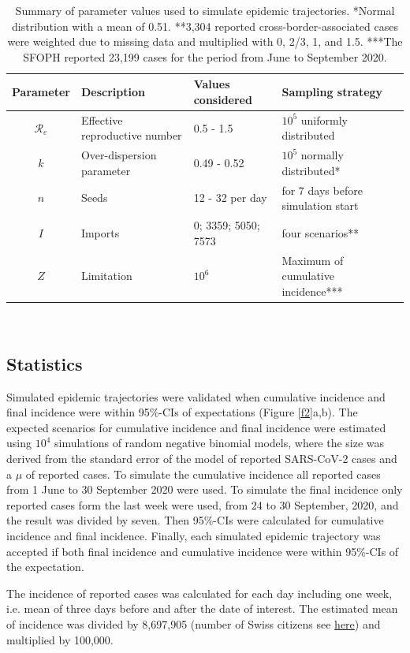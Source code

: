 \documentclass[10pt, a4paper, twoside]{article}
\begin{document}
\begin{multicols}{2}
\begin{table}
\begin{tabular}{clll}
	\hline
	Parameter & Description & Values considered & Sampling strategy\\
	\hline
	$\mathcal{R}_e$ & Effective reproductive number & 0.5 - 1.5 & $10^5$ uniformly distributed\\
	$k$ & Over-dispersion parameter & 0.49 - 0.52 & $10^5$ normally distributed*\\
	$n$ & Seeds & 12 - 32 per day & for 7 days before simulation start\\
	$I$ & Imports & 0; 3359; 5050; 7573 & four scenarios**\\
	$Z$ & Limitation & $10^6$ & Maximum of cumulative incidence***\\
	\hline
\end{tabular}
\caption{Summary of parameter values used to simulate epidemic trajectories. *Normal distribution with a mean of 0.51. **3,304 reported cross-border-associated cases were weighted due to missing data and multiplied with 0, 2/3, 1, and 1.5. ***The SFOPH reported 23,199 cases for the period from June to September 2020.\\}\ 
\label{t1}
\end{table}

\subsection{Statistics}
Simulated epidemic trajectories were validated when cumulative incidence and final incidence were within 95\%-CIs of expectations (Figure \ref{f2}a,b).
The expected scenarios for cumulative incidence and final incidence were estimated using $10^4$ simulations of random negative binomial models, where the size was derived from the standard error of the model of reported SARS-CoV-2 cases and a $\mu$ of reported cases.
To simulate the cumulative incidence all reported cases from 1 June to 30 September 2020 were used.
To simulate the final incidence only reported cases form the last week were used, from 24 to 30 September, 2020, and the result was divided by seven.
Then 95\%-CIs were calculated for cumulative incidence and final incidence. 
Finally, each simulated epidemic trajectory was accepted if both final incidence and cumulative incidence were within 95\%-CIs of the expectation.

The incidence of reported cases was calculated for each day including one week, i.e. mean of three days before and after the date of interest.
The estimated mean of incidence was divided by 8,697,905 (number of Swiss citizens see \href{https://www.worldometers.info/world-population/switzerland-population/}{here}) and multiplied by 100,000.


\end{multicols}
\end{document}
